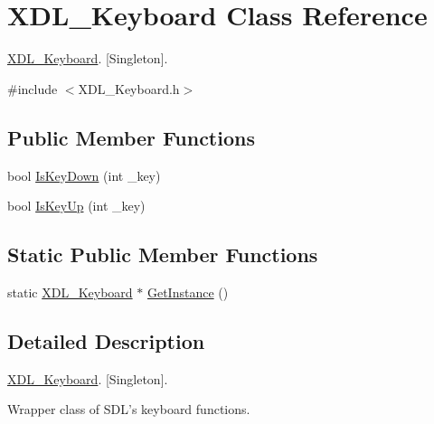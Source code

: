 \hypertarget{class_x_d_l___keyboard}{\section{X\-D\-L\-\_\-\-Keyboard Class Reference}
\label{class_x_d_l___keyboard}
}


\hyperlink{class_x_d_l___keyboard}{X\-D\-L\-\_\-\-Keyboard}. \mbox{[}Singleton\mbox{]}.  




{\ttfamily \#include $<$X\-D\-L\-\_\-\-Keyboard.\-h$>$}

\subsection*{Public Member Functions}
\begin{DoxyCompactItemize}
\item 
bool \hyperlink{class_x_d_l___keyboard_a62edde6c382fcf2861349756e828ffeb}{Is\-Key\-Down} (int \-\_\-key)
\item 
bool \hyperlink{class_x_d_l___keyboard_ae138fd6724656cfb3400537d89f2d58b}{Is\-Key\-Up} (int \-\_\-key)
\end{DoxyCompactItemize}
\subsection*{Static Public Member Functions}
\begin{DoxyCompactItemize}
\item 
static \hyperlink{class_x_d_l___keyboard}{X\-D\-L\-\_\-\-Keyboard} $\ast$ \hyperlink{class_x_d_l___keyboard_a16a920318c7e216d9896cd38ca137751}{Get\-Instance} ()
\end{DoxyCompactItemize}


\subsection{Detailed Description}
\hyperlink{class_x_d_l___keyboard}{X\-D\-L\-\_\-\-Keyboard}. \mbox{[}Singleton\mbox{]}. 

Wrapper class of S\-D\-L's keyboard functions. 

